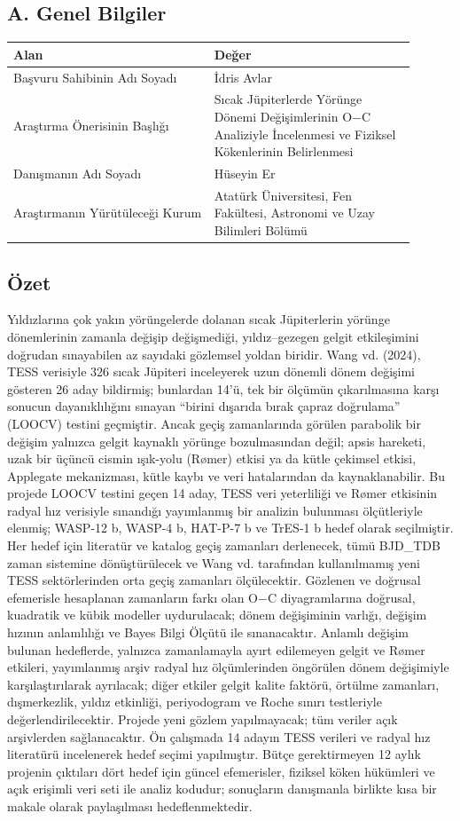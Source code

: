 \subsection*{A. Genel Bilgiler}
{\footnotesize\begin{longtable}{|p{0.450\linewidth}|p{0.450\linewidth}|}\hline
\textbf{Alan} & \textbf{Değer}\\\hline\endhead
Başvuru Sahibinin Adı Soyadı & İdris Avlar\\\hline
Araştırma Önerisinin Başlığı & Sıcak Jüpiterlerde Yörünge Dönemi Değişimlerinin O−C Analiziyle İncelenmesi ve Fiziksel Kökenlerinin Belirlenmesi\\\hline
Danışmanın Adı Soyadı & Hüseyin Er\\\hline
Araştırmanın Yürütüleceği Kurum & Atatürk Üniversitesi, Fen Fakültesi, Astronomi ve Uzay Bilimleri Bölümü\\\hline
\end{longtable}}
\subsection*{Özet}
Yıldızlarına çok yakın yörüngelerde dolanan sıcak Jüpiterlerin yörünge dönemlerinin zamanla değişip değişmediği, yıldız–gezegen gelgit etkileşimini doğrudan sınayabilen az sayıdaki gözlemsel yoldan biridir. Wang vd. (2024), TESS verisiyle 326 sıcak Jüpiteri inceleyerek uzun dönemli dönem değişimi gösteren 26 aday bildirmiş; bunlardan 14'ü, tek bir ölçümün çıkarılmasına karşı sonucun dayanıklılığını sınayan “birini dışarıda bırak çapraz doğrulama” (LOOCV) testini geçmiştir. Ancak geçiş zamanlarında görülen parabolik bir değişim yalnızca gelgit kaynaklı yörünge bozulmasından değil; apsis hareketi, uzak bir üçüncü cismin ışık-yolu (Rømer) etkisi ya da kütle çekimsel etkisi, Applegate mekanizması, kütle kaybı ve veri hatalarından da kaynaklanabilir. Bu projede LOOCV testini geçen 14 aday, TESS veri yeterliliği ve Rømer etkisinin radyal hız verisiyle sınandığı yayımlanmış bir analizin bulunması ölçütleriyle elenmiş; WASP-12 b, WASP-4 b, HAT-P-7 b ve TrES-1 b hedef olarak seçilmiştir. Her hedef için literatür ve katalog geçiş zamanları derlenecek, tümü BJD\_TDB zaman sistemine dönüştürülecek ve Wang vd. tarafından kullanılmamış yeni TESS sektörlerinden orta geçiş zamanları ölçülecektir. Gözlenen ve doğrusal efemerisle hesaplanan zamanların farkı olan O−C diyagramlarına doğrusal, kuadratik ve kübik modeller uydurulacak; dönem değişiminin varlığı, değişim hızının anlamlılığı ve Bayes Bilgi Ölçütü ile sınanacaktır. Anlamlı değişim bulunan hedeflerde, yalnızca zamanlamayla ayırt edilemeyen gelgit ve Rømer etkileri, yayımlanmış arşiv radyal hız ölçümlerinden öngörülen dönem değişimiyle karşılaştırılarak ayrılacak; diğer etkiler gelgit kalite faktörü, örtülme zamanları, dışmerkezlik, yıldız etkinliği, periyodogram ve Roche sınırı testleriyle değerlendirilecektir. Projede yeni gözlem yapılmayacak; tüm veriler açık arşivlerden sağlanacaktır. Ön çalışmada 14 adayın TESS verileri ve radyal hız literatürü incelenerek hedef seçimi yapılmıştır. Bütçe gerektirmeyen 12 aylık projenin çıktıları dört hedef için güncel efemerisler, fiziksel köken hükümleri ve açık erişimli veri seti ile analiz kodudur; sonuçların danışmanla birlikte kısa bir makale olarak paylaşılması hedeflenmektedir.

